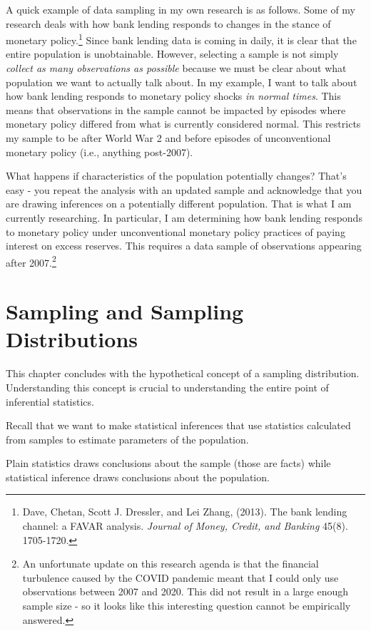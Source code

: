 \documentclass[
]{book}
\begin{document}
A quick example of data sampling in my own research is as follows. Some of my research deals with how bank lending responds to changes in the stance of monetary policy.\footnote{Dave, Chetan, Scott J. Dressler, and Lei Zhang, (2013). The bank lending channel: a FAVAR analysis. \emph{Journal of Money, Credit, and Banking} 45(8). 1705-1720.} Since bank lending data is coming in daily, it is clear that the entire population is unobtainable. However, selecting a sample is not simply \emph{collect as many observations as possible} because we must be clear about what population we want to actually talk about. In my example, I want to talk about how bank lending responds to monetary policy shocks \emph{in normal times}. This means that observations in the sample cannot be impacted by episodes where monetary policy differed from what is currently considered normal. This restricts my sample to be after World War 2 and before episodes of unconventional monetary policy (i.e., anything post-2007).

What happens if characteristics of the population potentially changes? That's easy - you repeat the analysis with an updated sample and acknowledge that you are drawing inferences on a potentially different population. That is what I am currently researching. In particular, I am determining how bank lending responds to monetary policy under unconventional monetary policy practices of paying interest on excess reserves. This requires a data sample of observations appearing after 2007.\footnote{An unfortunate update on this research agenda is that the financial turbulence caused by the COVID pandemic meant that I could only use observations between 2007 and 2020. This did not result in a large enough sample size - so it looks like this interesting question cannot be empirically answered.}

\section{Sampling and Sampling Distributions}\label{sampling-and-sampling-distributions}

This chapter concludes with the hypothetical concept of a sampling distribution. Understanding this concept is crucial to understanding the entire point of inferential statistics.

Recall that we want to make statistical inferences that use statistics calculated from samples to estimate parameters of the population.

Plain statistics draws conclusions about the sample (those are facts) while statistical inference draws conclusions about the population.
\end{document}

